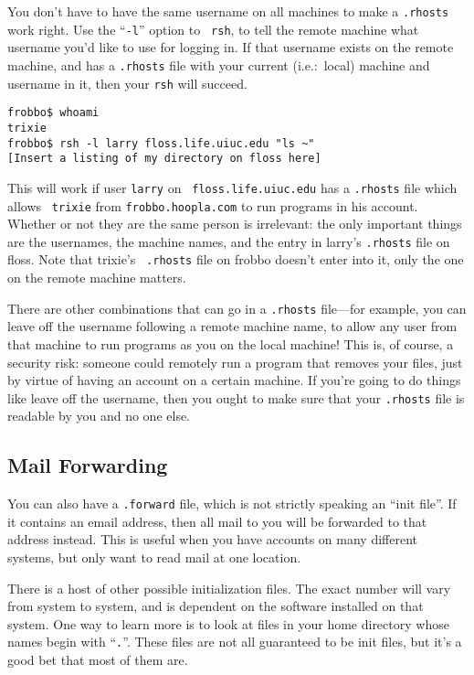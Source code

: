         You don't have to have the same username on all machines to
make a {\tt .rhosts} work right.  Use the ``{\tt -l}'' option to {\tt
rsh}, to tell the remote machine what username you'd like to use for
logging in.  If that username exists on the remote machine, and has a
{\tt .rhosts} file with your current (i.e.:~local) machine and
username in it, then your {\tt rsh} will succeed.

\begin{screen}\begin{verbatim}
frobbo$ whoami
trixie
frobbo$ rsh -l larry floss.life.uiuc.edu "ls ~"
[Insert a listing of my directory on floss here]
\end{verbatim}\end{screen}

        This will work if user {\tt larry} on {\tt
floss.life.uiuc.edu} has a {\tt .rhosts} file which allows {\tt
trixie} from {\tt frobbo.hoopla.com} to run programs in his account.
Whether or not they are the same person is irrelevant: the only
important things are the usernames, the machine names, and the entry
in larry's {\tt .rhosts} file on floss.  Note that trixie's {\tt
.rhosts} file on frobbo doesn't enter into it, only the one on the
remote machine matters.

        There are other combinations that can go in a {\tt .rhosts}
file---for example, you can leave off the username following a remote
machine name, to allow any user from that machine to run programs as
you on the local machine!  This is, of course, a security risk:
someone could remotely run a program that removes your files, just by
virtue of having an account on a certain machine.  If you're going to
do things like leave off the username, then you ought to make sure
that your {\tt .rhosts} file is readable by you and no one else.

\subsection{Mail Forwarding}
        You can also have a {\tt .forward} file, which is not strictly
speaking an ``init file''.  If it contains an email address, then all
mail to you will be forwarded to that address instead.  This is useful
when you have accounts on many different systems, but only want to
read mail at one location.

        There is a host of other possible initialization files.  The
exact number will vary from system to system, and is dependent on the
software installed on that system.  One way to learn more is to look
at files in your home directory whose names begin with ``{\tt .}''.
These files are not all guaranteed to be init files, but it's a good
bet that most of them are.

